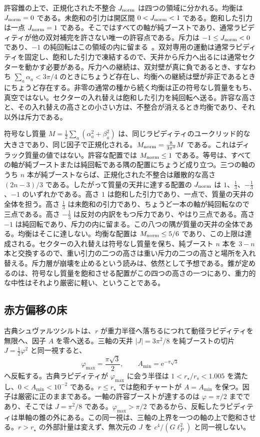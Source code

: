 \documentclass[a4paper]{article}
\begin{document}
許容錐の上で、正規化された不整合 \(J_{\rm norm}\) は四つの領域に分かれる。均衡は \(J_{\rm norm}=0\) である。未飽和の引力は開区間 \(0<J_{\rm norm}<1\) である。飽和した引力は一点 \(J_{\rm norm}=1\) である。そこではすべての軸が純ブーストであり、通常ラピディティが他の双対補完を許さない唯一の許容点である。斥力は \(-1\le J_{\rm norm}<0\) であり、\(-1\) の純回転はこの領域の内に留まる~\cite{dst-d4l}。双対専用の運動は通常ラピディティを固定し、飽和した引力で凍結するので、天井から斥力へ出るには通常セクターを動かす必要がある。斥力への継続は、双対壁が真に負であるとき、すなわち \(\sum_a\alpha_a<3\pi/4\) のときにちょうど存在し、均衡への継続は壁が非正であるときにちょうど存在する。非零の通常の種から続く均衡は正の符号なし質量をもち、真空ではない。セクターの入れ替えは飽和した引力を純回転へ送る。許容な高さと、その入れ替えの高さとの小さい方は、不整合が消えるとき均衡であり、それ以外は斥力である。

符号なし質量 \(M=\frac12\sum_a(\alpha_a^2+\beta_a^2)\) は、同じラピディティのユークリッド的な大きさであり、同じ因子で正規化される。\(M_{\rm norm}=\frac8{3\pi^2}M\) である。これはディラック質量の値ではない。許容な配置では \(M_{\rm norm}\le 1\) である。等号は、すべての軸が純ブーストまたは純回転である隅の配置にちょうど成り立つ。三つの軸のうち \(n\) 本が純ブーストならば、正規化された不整合は離散的な高さ \((2n-3)/3\) である。したがって質量の天井に達する配置の \(J_{\rm norm}\) は \(1\)、\(\frac13\)、\(-\frac13\)、\(-1\) のいずれかである。高さ \(1\) は飽和した引力であり、一点で、質量の天井の全体を担う。高さ \(\frac13\) は未飽和の引力であり、ちょうど一本の軸が純回転なので三点である。高さ \(-\frac13\) は反対の内訳をもつ斥力であり、やはり三点である。高さ \(-1\) は純回転であり、斥力の内に留まる。この八つの隅が質量の天井の全体である。均衡はそこに達しない。均衡な配置は \(M_{\rm norm}\le 5/6\) であり、この上限は達成される。セクターの入れ替えは符号なし質量を保ち、純ブースト \(n\) 本を \(3-n\) 本と交換するので、重い引力の二つの高さは重い斥力の二つの高さと場所を入れ替える。斥力層が崩壊を止めるという読みは、依然として予想である。錐が定めるのは、符号なし質量を飽和させる配置がこの四つの高さの一つにあり、重力的な中性はそれより厳密に軽い、ということである。

\subsection{赤方偏移の床}
\label{subsec:no-horizon}

古典シュヴァルツシルトは、\(r\) が重力半径へ落ちるにつれて動径ラピディティを無限へ、因子 \(A\) を零へ送る。三軸の天井 \(|J|=3\pi^2/8\) を純ブーストの切片 \(J=\tfrac12\varphi^2\) と同一視すると、
\[
\varphi_{\max}=\frac{\pi\sqrt{3}}{2},\qquad
A_{\min}=\mathrm{e}^{-\pi\sqrt{3}}
\]
へ反転する。古典ラピディティが \(\varphi_{\max}\) に会う半径は \(1<r_\star/r_s<1.005\) を満たし、\(0<A_{\min}<10^{-2}\) である。\(r\le r_\star\) では飽和チャートが \(A=A_{\min}\) を保つ。因子は厳密に正のままである。一軸の許容ブーストが達するのは \(\varphi=\pi/2\) までであり、そこでは \(J=\pi^2/8\) である。\(\varphi_{\max}>\pi/2\) であるから、反転したラピディティは単軸の錐の外にある。この同一視は、三軸の上界を一つの軸の上で飽和させる。\(r>r_\star\) の外部計量は変えず、無次元の \(J\) を \(c^4/(G\ell_P^2)\) と同一視しない。
\end{document}
